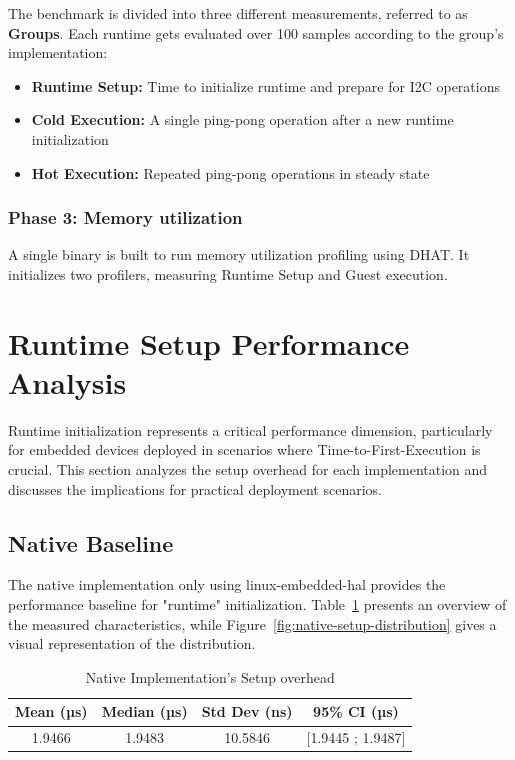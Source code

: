 The benchmark is divided into three different measurements, referred to as \textbf{Groups}. Each runtime gets evaluated over 100 samples according to the group's implementation:
\begin{itemize}
    \item \textbf{Runtime Setup:} Time to initialize runtime and prepare for I2C operations
    \item \textbf{Cold Execution:} A single ping-pong operation after a new runtime initialization
    \item \textbf{Hot Execution:} Repeated ping-pong operations in steady state
\end{itemize}

\subsubsection{Phase 3: Memory utilization}
A single binary is built to run memory utilization profiling using DHAT. It initializes two profilers, measuring Runtime Setup and Guest execution.

\section{Runtime Setup Performance Analysis}
\label{sec:eval-setup}

Runtime initialization represents a critical performance dimension, particularly for embedded devices deployed in scenarios where Time-to-First-Execution is crucial. This section analyzes the setup overhead for each implementation and discusses the implications for practical deployment scenarios.

\subsection{Native Baseline}
\label{subsec:eval-setup-native}

The native implementation only using linux-embedded-hal provides the performance baseline for "runtime" initialization. Table~\ref{tab:native-setup} presents an overview of the measured characteristics, while Figure~\ref{fig:native-setup-distribution} gives a visual representation of the distribution.

\begin{table}[h]
    \centering
    \caption{Native Implementation's Setup overhead}
    \label{tab:native-setup}
    \begin{tabular}{cccc}
        \toprule
        \textbf{Mean (µs)} & \textbf{Median (µs)} & \textbf{Std Dev (ns)} & \textbf{95\% CI (µs)} \\
        \midrule
        1.9466 & 1.9483 & 10.5846 & [1.9445 ; 1.9487] \\
        \bottomrule
    \end{tabular}
\end{table}

